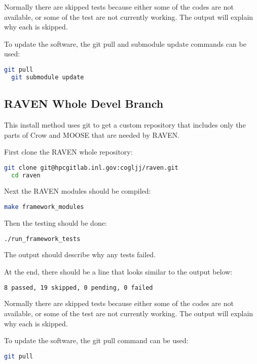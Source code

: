 Normally there are skipped tests because either some of the codes are
not available, or some of the test are not currently working.  The
output will explain why each is skipped.


To update the software, the git pull and submodule update commands can
be used:

\begin{lstlisting}[language=bash]
  git pull
  git submodule update
\end{lstlisting}


\subsection{RAVEN Whole Devel Branch}

This install method uses git to get a custom repository that includes
only the parts of Crow and MOOSE that are needed by RAVEN.

First clone the RAVEN whole repository:

\begin{lstlisting}[language=bash]
  git clone git@hpcgitlab.inl.gov:cogljj/raven.git
  cd raven
\end{lstlisting}

Next the RAVEN modules should be compiled:

\begin{lstlisting}[language=bash]
make framework_modules
\end{lstlisting}

Then the testing should be done:

\begin{lstlisting}[language=bash]
  ./run_framework_tests
\end{lstlisting}

The output should describe why any tests failed.

At the end, there should be a line that looks similar to the output below:
\begin{lstlisting}[language=bash]
8 passed, 19 skipped, 0 pending, 0 failed
\end{lstlisting}

Normally there are skipped tests because either some of the codes are
not available, or some of the test are not currently working.  The
output will explain why each is skipped.


To update the software, the git pull command can be used:

\begin{lstlisting}[language=bash]
  git pull
\end{lstlisting}

